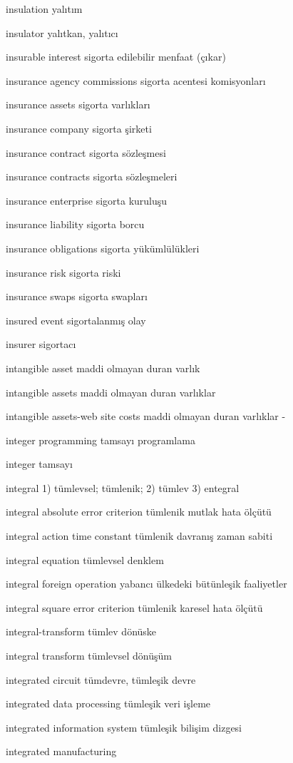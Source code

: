 \documentclass[12pt,fleqn]{article}\usepackage{../../common}
\begin{document}
insulation yalıtım

insulator yalıtkan, yalıtıcı

insurable interest sigorta edilebilir menfaat (çıkar)

insurance agency commissions sigorta acentesi komisyonları

insurance assets sigorta varlıkları

insurance company sigorta şirketi

insurance contract sigorta sözleşmesi

insurance contracts sigorta sözleşmeleri

insurance enterprise sigorta kuruluşu

insurance liability sigorta borcu

insurance obligations sigorta yükümlülükleri

insurance risk sigorta riski

insurance swaps sigorta swapları

insured event sigortalanmış olay

insurer sigortacı

intangible asset maddi olmayan duran varlık

intangible assets maddi olmayan duran varlıklar

intangible assets-web site costs maddi olmayan duran varlıklar -

integer programming tamsayı programlama

integer tamsayı

integral 1) tümlevsel; tümlenik; 2) tümlev 3) entegral

integral absolute error criterion tümlenik mutlak hata ölçütü

integral action time constant tümlenik davranış zaman sabiti

integral equation tümlevsel denklem

integral foreign operation yabancı ülkedeki bütünleşik faaliyetler

integral square error criterion tümlenik karesel hata ölçütü

integral-transform tümlev dönüske

integral transform tümlevsel dönüşüm

integrated circuit tümdevre, tümleşik devre

integrated data processing tümleşik veri işleme

integrated information system tümleşik bilişim dizgesi

integrated manufacturing
\end{document}

